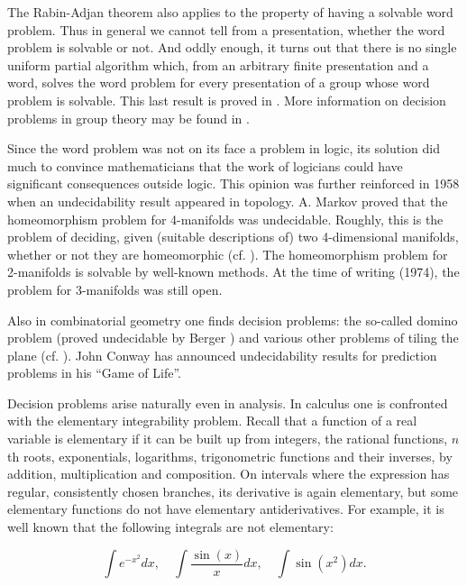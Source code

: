 \documentclass[11pt]{article}
\newcommand{\origpage}[1]{\marginnote{\footnotesize\textbf{[#1]}}}
\begin{document}
The Rabin-Adjan theorem also applies to the property of having a solvable word problem. Thus in general we cannot tell from a presentation, whether the word problem is solvable or not. And oddly enough, it turns out that there is no single uniform partial algorithm which, from an arbitrary finite presentation and a word, solves the word problem for every presentation of a group whose word problem is solvable. This last result is proved in \cite{r5}. More information on decision problems in group theory may be found in \cite{r25}.

Since the word problem was not on its face a problem in logic, its solution did much to convince mathematicians that the work of logicians could have significant consequences outside logic. This opinion was further reinforced in 1958 when an undecidability result appeared in topology. A. Markov proved \cite{r21} that the homeomorphism problem for 4-manifolds was undecidable. Roughly, this is the problem of deciding, given (suitable descriptions of) two 4-dimensional manifolds, whether or not they are homeomorphic (cf. \cite{r4}). The homeomorphism problem for 2-manifolds is solvable by well-known methods. At the time of writing (1974), the problem for 3-manifolds was still open.

\origpage{727}Also in combinatorial geometry one finds decision problems: the so-called domino problem (proved undecidable by Berger \cite{r2}) and various other problems of tiling the plane (cf. \cite{r37}). John Conway has announced undecidability results for prediction problems in his ``Game of Life''.

Decision problems arise naturally even in analysis. In calculus one is confronted with the elementary integrability problem. Recall that a function of a real variable is elementary if it can be built up from integers, the rational functions, $n$th roots, exponentials, logarithms, trigonometric functions and their inverses, by addition, multiplication and composition. On intervals where the expression has regular, consistently chosen branches, its derivative is again elementary, but some elementary functions do not have elementary antiderivatives. For example, it is well known \cite{r35} that the following integrals are not elementary:

\[
\int e^{-x^{2}} d x, \quad \int \frac{\sin (x)}{x} d x, \quad \int \sin \left(x^{2}\right) d x .
\]
\end{document}

